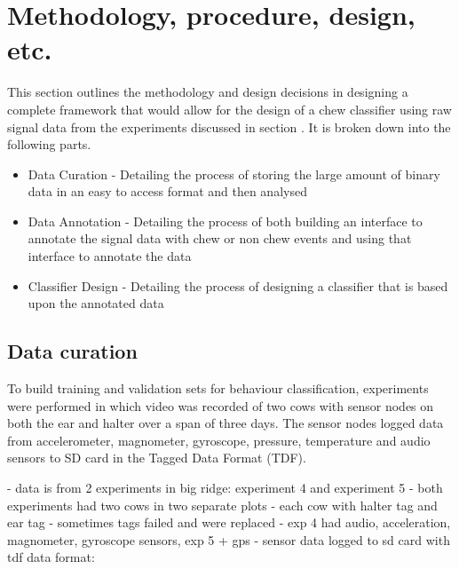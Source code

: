 \chapter{Methodology, procedure, design, etc.}

This section outlines the methodology and design decisions in designing a complete framework that would allow for the design of a chew classifier using raw signal data from the experiments discussed in section  . It is broken down into the following parts.

\begin{itemize}
\item Data Curation - Detailing the process of storing the large amount of binary data in an easy to access format and then analysed

\item Data Annotation - Detailing the process of both building an interface to annotate the signal data with chew or non chew events and using that interface to annotate the data

\item Classifier Design - Detailing the process of designing a classifier that is based upon the annotated data
\end{itemize}



\section{Data curation}

To build training and validation sets for behaviour classification, experiments were performed in which video was recorded of two cows with sensor nodes on both the ear and halter over a span of three days. The sensor nodes logged data from accelerometer, magnometer, gyroscope, pressure, temperature and audio sensors to SD card in the Tagged Data Format (TDF). 

- data is from 2 experiments in big ridge: experiment 4 and experiment 5
	- both experiments had two cows in two separate plots
		- each cow with halter tag and ear tag	
		- sometimes tags failed and were replaced	
	- exp 4 had audio, acceleration, magnometer, gyroscope sensors, exp 5 + gps	
	- sensor data logged to sd card with tdf data format: %
	
